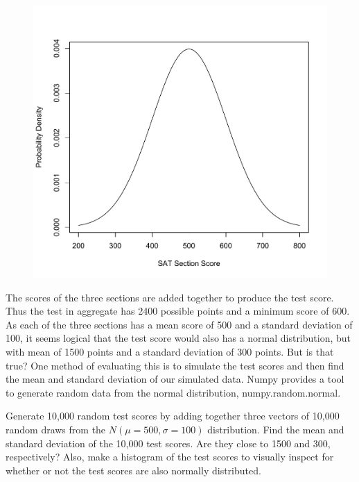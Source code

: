 \begin{figure}[h]
\centering
\includegraphics[width=\textwidth]{normaldist.pdf}
\end{figure}

The scores of the three sections are added together to produce the test score. 
Thus the test in aggregate has 2400 possible points and a minimum score of 600.  
As each of the three sections has a mean score of 500 and a standard deviation of 100, it seems logical that the test score would also has a normal distribution, 
but with mean of 1500 points and a standard deviation of 300 points. 
But is that true? One method of evaluating this is to simulate the test scores and then find the mean and standard deviation of our simulated data. 
Numpy provides a tool to generate random data from the normal distribution, numpy.random.normal.

\begin{problem}
Generate 10,000 random test scores by adding together three vectors of 10,000 random draws from the $N(\mu=500,\sigma=100)$ distribution. 
Find the mean and standard deviation of the 10,000 test scores. 
Are they close to 1500 and 300, respectively? 
Also, make a histogram of the test scores to visually inspect for whether or not the test scores are also normally distributed.
\end{problem}

